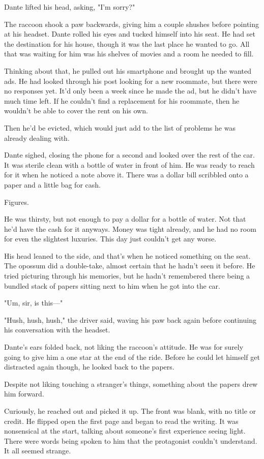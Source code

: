 Dante lifted his head, asking, "I'm sorry?"

The raccoon shook a paw backwards, giving him a couple shushes before pointing at his headset. Dante rolled his eyes and tucked himself into his seat. He had set the destination for his house, though it was the last place he wanted to go. All that was waiting for him was his shelves of movies and a room he needed to fill.

Thinking about that, he pulled out his smartphone and brought up the wanted ads. He had looked through his post looking for a new roommate, but there were no responses yet. It'd only been a week since he made the ad, but he didn't have much time left. If he couldn't find a replacement for his roommate, then he wouldn't be able to cover the rent on his own.

Then he'd be evicted, which would just add to the list of problems he was already dealing with.

Dante sighed, closing the phone for a second and looked over the rest of the car. It was sterile clean with a bottle of water in front of him. He was ready to reach for it when he noticed a note above it. There was a dollar bill scribbled onto a paper and a little bag for cash.

Figures.

He was thirsty, but not enough to pay a dollar for a bottle of water. Not that he'd have the cash for it anyways. Money was tight already, and he had no room for even the slightest luxuries. This day just couldn't get any worse.

His head leaned to the side, and that's when he noticed something on the seat. The opossum did a double-take, almost certain that he hadn't seen it before. He tried picturing through his memories, but he hadn't remembered there being a bundled stack of papers sitting next to him when he got into the car.

"Um, sir, is this---"

"Hush, hush, hush," the driver said, waving his paw back again before continuing his conversation with the headset.

Dante's ears folded back, not liking the raccoon's attitude. He was for surely going to give him a one star at the end of the ride. Before he could let himself get distracted again though, he looked back to the papers.

Despite not liking touching a stranger's things, something about the papers drew him forward.

Curiously, he reached out and picked it up. The front was blank, with no title or credit. He flipped open the first page and began to read the writing. It was nonsensical at the start, talking about someone's first experience seeing light. There were words being spoken to him that the protagonist couldn't understand. It all seemed strange.


